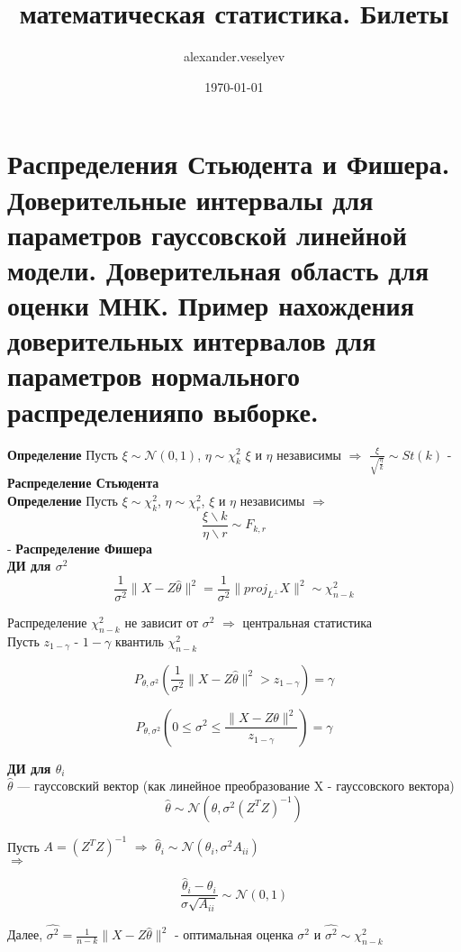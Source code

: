 \documentclass{article}
\title{математическая статистика. Билеты}
\author{alexander.veselyev }
\date{\today}
\begin{document}
\section{Распределения Стьюдента и Фишера. Доверительные интервалы для параметров гауссовской линейной модели. Доверительная область для оценки МНК. Пример нахождения доверительных интервалов для параметров нормального распределенияпо выборке.}

\textbf{Определение} Пусть $\xi\sim\mathcal{N}(0,1)$, $\eta\sim\chi^2_k$ $\xi$ и $\eta$ независимы $\Rightarrow$ $\frac{\xi}{\sqrt{\frac{\eta}{k}}}\sim St(k)$ - \textbf{Распределение Стьюдента}\\

\textbf{Определение} Пусть $\xi\sim\chi^2_k$, $\eta\sim\chi^2_r$, $\xi$ и $\eta$ независимы $\Rightarrow$ $$\frac{\xi\backslash k}{\eta\backslash r}\sim F_{k,r}$$ - 
\textbf{Распределение Фишера}\\

\textbf{ДИ для $\sigma^2$}\\

$$\frac{1}{\sigma^2}\|X-Z\widehat{\theta}\|^2=\frac{1}{\sigma^2}\|proj_{L^\perp}X\|^2\sim\chi^2_{n-k}$$

Распределение $\chi^2_{n-k}$ не зависит от $\sigma^2$ $\Rightarrow$ центральная статистика\\

Пусть $z_{1-\gamma}$ - $1-\gamma$ квантиль $\chi^2_{n-k}$

$$P_{\theta,\sigma^2}\left( \frac{1}{\sigma^2}\|X-Z\widehat{\theta}\|^2 > z_{1-\gamma} \right) = \gamma$$

$$P_{\theta, \sigma^2}\left( 0\leq\sigma^2\leq\frac{\|X-Z\theta\|^2}{z_{1-\gamma}} \right) = \gamma$$

\textbf{ДИ для $\theta_i$}\\

$\widehat{\theta}$ --- гауссовский вектор (как линейное преобразование X - гауссовского вектора)\\

$$\widehat{\theta}\sim\mathcal{N}(\theta,\sigma^2(Z^TZ)^{-1})$$

Пусть $A = (Z^TZ)^{-1}$ $\Rightarrow$ $\widehat{\theta}_i\sim\mathcal{N}(\theta_i, \sigma^2A_{ii})$\\

$\Rightarrow$

$$ \frac{\widehat{\theta}_i - \theta_i}{\sigma\sqrt{A_{ii}}}\sim\mathcal{N}(0,1) $$

Далее, $\widehat{\sigma^2} = \frac{1}{n-k}\|X-Z\widehat{\theta}\|^2$ - оптимальная оценка $\sigma^2$
и $\widehat{\sigma^2}\sim\chi^2_{n-k}$\\
\end{document}
